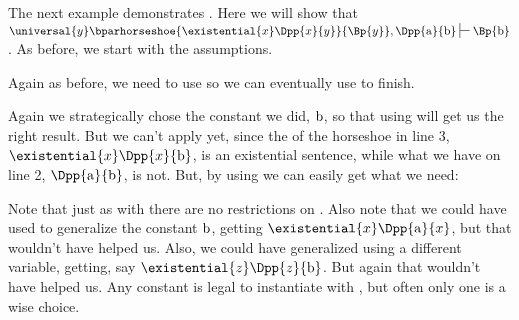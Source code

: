 The next example demonstrates . Here we will show that $\universal{\variable{y}}\bparhorseshoe{\existential{\variable{x}}\Dpp{\variable{x}}{\variable{y}}}{\Bp{\variable{y}}},\Dpp{\constant{a}}{\constant{b}}\sststile{}{}\Bp{\constant{b}}$.
As before, we start with the assumptions.
\begin{gproof}[\label{GQDExampleD}]
\end{gproof}
Again as before, we need to use  so we can eventually use  to finish. 
\begin{gproof}[\label{GQDExampleE}]
\end{gproof}
Again we strategically chose the constant we did, $\mathrm{b}$, so that using  will get us the right result. 
But we can't apply  yet, since the  of the horseshoe in line 3, $\existential{\variable{x}}\Dpp{\variable{x}}{\constant{b}}$, is an existential sentence, while what we have on line 2, $\Dpp{\constant{a}}{\constant{b}}$, is not. 
But, by using  we can easily get what we need:
\begin{gproof}[\label{GQDExampleF}]
\end{gproof}
Note that just as with  there are no restrictions on .
Also note that we could have used  to generalize the constant $\mathrm{b}$, getting $\existential{\variable{x}}\Dpp{\constant{a}}{\variable{x}}$, but that wouldn't have helped us.
Also, we could have generalized using a different variable, getting, say $\existential{\variable{z}}\Dpp{\variable{z}}{\constant{b}}$.
But again that wouldn't have helped us. 
Any constant is legal to instantiate with , but often only one is a wise choice.

